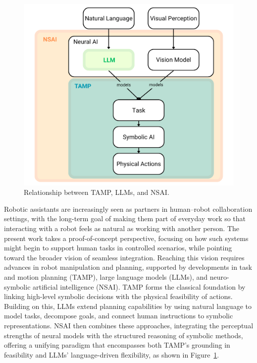 \documentclass[12pt]{extarticle}
\begin{document}
\begin{figure}[H]
    \centering
    \includegraphics[width=0.7\linewidth]{images/background_graph.png}
    \caption{Relationship between TAMP, LLMs, and NSAI.}
    \label{fig:background-graph}
\end{figure}

Robotic assistants are increasingly seen as partners in human–robot collaboration settings, with the long-term goal of making them part of everyday work so that interacting with a robot feels as natural as working with another person. The present work takes a proof-of-concept perspective, focusing on how such systems might begin to support human tasks in controlled scenarios, while pointing toward the broader vision of seamless integration. Reaching this vision requires advances in robot manipulation and planning, supported by developments in task and motion planning (TAMP), large language models (LLMs), and neuro-symbolic artificial intelligence (NSAI). TAMP forms the classical foundation by linking high-level symbolic decisions with the physical feasibility of actions. Building on this, LLMs extend planning capabilities by using natural language to model tasks, decompose goals, and connect human instructions to symbolic representations. NSAI then combines these approaches, integrating the perceptual strengths of neural models with the structured reasoning of symbolic methods, offering a unifying paradigm that encompasses both TAMP’s grounding in feasibility and LLMs’ language-driven flexibility, as shown in Figure~\ref{fig:background-graph}.
\end{document}
